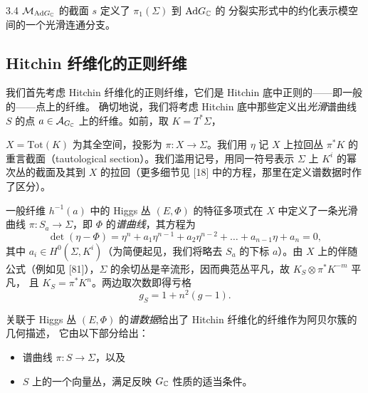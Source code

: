 \begin{thm}{3.4}
$\mathcal{M}_{\mathrm{Ad}G_{\mathbb{C}}}$ 的截面 $s$ 定义了 $\pi_1(\Sigma)$ 到 $\mathrm{Ad}G_{\mathbb{C}}$ 的
分裂实形式中的约化表示模空间的一个光滑连通分支。
\end{thm}

\subsection{Hitchin 纤维化的正则纤维}

我们首先考虑 Hitchin 纤维化的正则纤维，它们是 Hitchin 底中正则的——即一般的——点上的纤维。
确切地说，我们将考虑 Hitchin 底中那些定义出\emph{光滑}谱曲线 $S$ 的点
$a\in\mathcal{A}_{G_{\mathbb{C}}}$ 上的纤维。如前，取 $K=T^*\Sigma$，

$X=\mathrm{Tot}(K)$ 为其全空间，投影为 $\pi:X\to\Sigma$。我们用 $\eta$ 记 $X$ 上拉回丛
$\pi^*K$ 的重言截面（tautological section）。我们滥用记号，用同一符号表示 $\Sigma$ 上 $K^i$ 的幂次丛的截面及其到 $X$
的拉回（更多细节见 [18] 中的方程，那里在定义谱数据时作了区分）。

一般纤维 $h^{-1}(a)$ 中的 Higgs 丛 $(E,\Phi)$ 的特征多项式在 $X$ 中定义了一条光滑曲线
$\pi:S_a\to\Sigma$，即 $\Phi$ 的\emph{谱曲线}，其方程为
\begin{equation}
\det(\eta-\Phi)=\eta^n+a_1\eta^{n-1}+a_2\eta^{n-2}+\ldots+a_{n-1}\eta+a_n=0, \tag{3.5}
\end{equation}
其中 $a_i\in H^0(\Sigma,K^i)$（为简便起见，我们将略去 $S_a$ 的下标 $a$）。由 $X$ 上的伴随
公式（例如见 [81]），$\Sigma$ 的余切丛是辛流形，因而典范丛平凡，故 $K_S\otimes\pi^*K^{-m}$ 平凡，
且 $K_S=\pi^*K^n$。两边取次数即得亏格
\[
g_S=1+n^2(g-1).
\]

关联于 Higgs 丛 $(E,\Phi)$ 的\emph{谱数据}给出了 Hitchin 纤维化的纤维作为阿贝尔簇的几何描述，
它由以下部分给出：
\begin{itemize}[leftmargin=1.4em,itemsep=1pt,topsep=1pt]
\item 谱曲线 $\pi:S\to\Sigma$，以及
\item $S$ 上的一个向量丛，满足反映 $G_{\mathbb{C}}$ 性质的适当条件。
\end{itemize}

